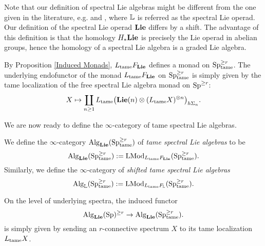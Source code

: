 \begin{remark}
Note that our definition of spectral Lie algebras might be different from the one given in the literature, e.g. \cite{Camarena_mod2_free_spectral_Lie_algebra} and \cite{ChingBar}, where ${\mathbb{L}}$ is referred as the spectral Lie operad. 
Our definition of the spectral Lie operad $\mathbf{Lie}$ differs by a shift.
The advantage of this definition is that the homology $H_{*}\mathbf{Lie}$ is precisely the Lie operad in abelian groups, hence the homology of a spectral Lie algebra is a graded Lie algebra.
\end{remark}

By Proposition \ref{Induced Monads}, $L_{\operatorname{\operatorname{tame}}}F_{\mathbf{Lie}}$ defines a monad on $\operatorname{Sp}^{\geq r}_{\operatorname{\operatorname{tame}}}$.
The underlying endofunctor of the monad $L_{\operatorname{\operatorname{tame}}}F_{\mathbf{Lie}}$ on $\operatorname{Sp}^{\geq r}_{\operatorname{\operatorname{tame}}}$ is simply given by the tame localization of the free spectral Lie algebra monad on $\operatorname{Sp}^{\geq r}$:
\begin{align*}
X \mapsto  
\coprod_{n\geq 1}
		L_{\operatorname{\operatorname{tame}}}\big(
		 \mathbf{Lie}(n) \otimes (L_{\operatorname{\operatorname{tame}}} X)^{\otimes n}
		\big)_{h\Sigma_n}.
\end{align*}


We are now ready to define the $\infty$-category of tame spectral Lie algebras.
\begin{definition}
\label{Def of tame spectral Lie algebras}
    We define the $\infty$-category $\operatorname{Alg}_{\mathbf{Lie}}(\operatorname{Sp}^{\geq r}_{\operatorname{\operatorname{tame}}})$ of \emph{tame spectral Lie algebras} to be 
    $$
    \operatorname{Alg}_{\mathbf{Lie}}(\operatorname{Sp}^{\geq r}_{\operatorname{\operatorname{tame}}}) := \operatorname{LMod}_{	L_{\operatorname{\operatorname{tame}}}F_{\mathbf{Lie}}}(\operatorname{Sp}^{\geq r}_{\operatorname{\operatorname{tame}}}).
    $$
    Similarly, we define the $\infty$-category of \emph{shifted tame spectral Lie algebras}
    $$
    \operatorname{Alg}_{{\mathbb{L}}}(\operatorname{Sp}^{\geq r}_{\operatorname{\operatorname{tame}}}) := \operatorname{LMod}_{	L_{\operatorname{\operatorname{tame}}}F_{{\mathbb{L}}}}(\operatorname{Sp}^{\geq r}_{\operatorname{\operatorname{tame}}}).
    $$
\end{definition}

On the level of underlying spectra,
the induced functor 
$$
\operatorname{Alg}_{\mathbf{Lie}}(\operatorname{Sp})^{\geq r} 
\to 
\operatorname{Alg}_{\mathbf{Lie}}(\operatorname{Sp}^{\geq r}_{\operatorname{\operatorname{tame}}}).
$$
is simply given by sending an $r$-connective spectrum $X$ to its tame localization $L_{\operatorname{\operatorname{tame}}}X$.

